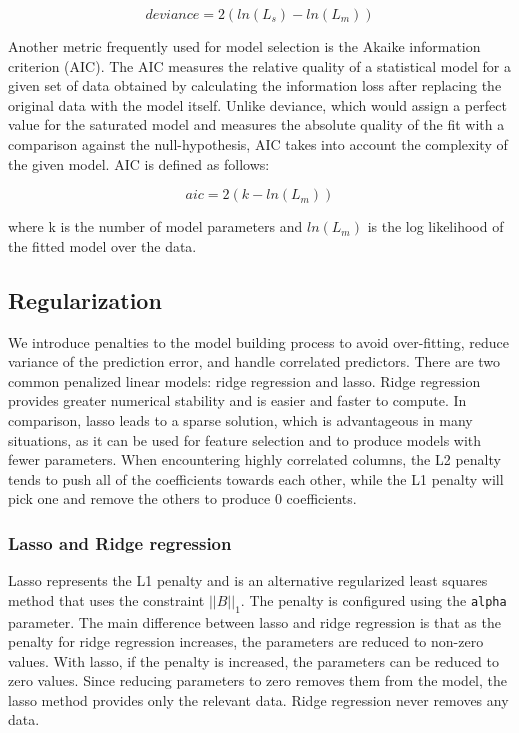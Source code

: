 \[ deviance = 2({ln(L_{s})} - {ln(L_{m})}) \]

Another metric frequently used for model selection is the Akaike information criterion (AIC). The AIC measures the
relative quality of a statistical model for a given set of data obtained by calculating the information loss after
replacing the original data with the model itself. Unlike deviance, which would assign a perfect value for the
saturated model and measures the absolute quality of the fit with a comparison against the null-hypothesis, AIC
takes into account the complexity of the given model. AIC is defined as follows:

\[ aic = 2(k - ln(L_{m}))\]

where k is the number of model parameters and $ln(L_{m})$ is the log likelihood of the fitted model over the data.

\subsection{Regularization} \label{regularization}
We introduce penalties to the model building process to avoid over-fitting, reduce variance of the prediction
error, and handle correlated predictors. There are two common penalized linear models: ridge regression and
lasso. Ridge regression provides greater numerical stability and is easier and faster to compute. In comparison,
lasso leads to a sparse solution, which is advantageous in many situations, as it can be used for feature selection
and to produce models with fewer parameters. When encountering highly correlated columns, the L2 penalty tends to
push all of the coefficients towards each other, while the L1 penalty will pick one and remove the others to
produce 0 coefficients.

\subsubsection{Lasso and Ridge regression}

Lasso represents the L1 penalty and is an alternative regularized least squares method that uses the constraint
$||B||_1$. The penalty is configured using the \texttt{alpha} parameter. The main difference between lasso and
ridge regression is that as the penalty for ridge regression increases, the parameters are reduced to non-zero
values. With lasso, if the penalty is increased, the parameters can be reduced to zero values. Since reducing
parameters to zero removes them from the model, the lasso method provides only the relevant data. Ridge regression
never removes any data.


